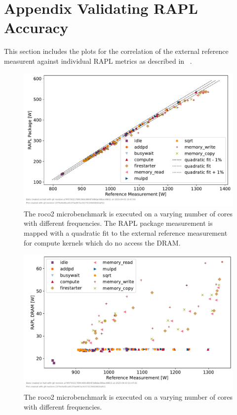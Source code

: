%

\chapter{Appendix Validating RAPL Accuracy}
\label{app:validating_rapl_accuracy}
This section includes the plots for the correlation of the external reference measurent against individual RAPL metrics as described in ~.

\begin{figure}[]
    \centering
    \includegraphics[width=0.8\columnwidth]{fig/rapl-accuracy/rapl-accuracy-package.pdf}
    \caption{The roco2 microbenchmark is executed on a varying number of cores with different frequencies.
    The RAPL package measurement is mapped with a quadratic fit to the external reference measurement for compute kernels which do no access the DRAM.}
\end{figure}

\begin{figure}[]
    \centering
    \includegraphics[width=0.8\columnwidth]{fig/rapl-accuracy/rapl-accuracy-dram.pdf}
    \caption{The roco2 microbenchmark is executed on a varying number of cores with different frequencies.}
\end{figure}

